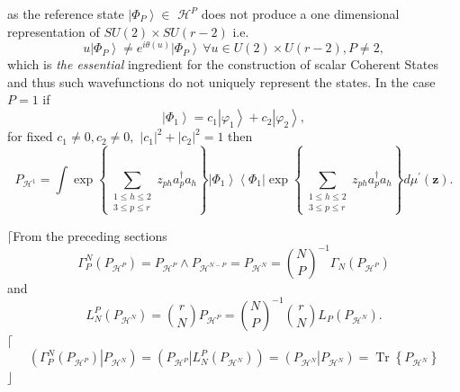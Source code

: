 \documentclass[aps,preprint]{revtex4}%
\begin{document}
as the reference state $\left\vert \Phi_{P}\right\rangle \in$ $\mathcal{H}%
^{P}$ does not produce a one dimensional representation of $SU\left(
2\right)  \times SU\left(  r-2\right)  $ i.e.
\begin{equation}
u\left\vert \Phi_{P}\right\rangle \neq e^{i\theta\left(  u\right)  }\left\vert
\Phi_{P}\right\rangle \,\forall u\in U\left(  2\right)  \times U\left(
r-2\right)  ,P\neq2,
\end{equation}
which is \emph{the essential} ingredient for the construction of scalar
Coherent States and thus such wavefunctions do not uniquely represent the
states. In the case $P=1$ if
\begin{equation}
\left\vert \Phi_{1}\right\rangle =c_{1}\left\vert \varphi_{1}\right\rangle
+c_{2}\left\vert \varphi_{2}\right\rangle ,
\end{equation}
for fixed $c_{1}\neq0,c_{2}\neq0,$ $\left\vert c_{1}\right\vert ^{2}%
+\left\vert c_{2}\right\vert ^{2}=1$ then
\begin{equation}
P_{\mathcal{H}^{1}}=\int\exp\left\{  \sum\limits_{\substack{1\leq
h\leq2\\3\leq p\leq r}}z_{ph}a_{p}^{\dagger}a_{h}\right\}  \left\vert \Phi
_{1}\right\rangle \left\langle \Phi_{1}\right\vert \exp\left\{  \sum
\limits_{\substack{1\leq h\leq2\\3\leq p\leq r}}z_{ph}a_{p}^{\dagger}%
a_{h}\right\}  d\mu^{\prime}\left(  \mathbf{z}\right)  .
\end{equation}


$\lceil$From the preceding sections
\begin{equation}
\Gamma_{P}^{N}\left(  P_{\mathcal{H}^{P}}\right)  =P_{\mathcal{H}^{P}}\wedge
P_{\mathcal{H}^{N-P}}=P_{\mathcal{H}^{N}}=\binom{N}{P}^{-1}\Gamma_{N}\left(
P_{\mathcal{H}^{P}}\right)
\end{equation}
and
\begin{equation}
L_{N}^{P}\left(  P_{\mathcal{H}^{N}}\right)  =\binom{r}{N}P_{\mathcal{H}^{P}%
}=\binom{N}{P}^{-1}\binom{r}{N}L_{P}\left(  P_{\mathcal{H}^{N}}\right)  .
\end{equation}
$\lceil$%
\begin{equation}
\left(  \left.  \Gamma_{P}^{N}\left(  P_{\mathcal{H}^{P}}\right)  \right\vert
P_{\mathcal{H}^{N}}\right)  =\left(  \left.  P_{\mathcal{H}^{P}}\right\vert
L_{N}^{P}\left(  P_{\mathcal{H}^{N}}\right)  \right)  =\left(  \left.
P_{\mathcal{H}^{N}}\right\vert P_{\mathcal{H}^{N}}\right)  =\operatorname*{Tr}%
\left\{  P_{\mathcal{H}^{N}}\right\}
\end{equation}
$\rfloor$
\end{document}
